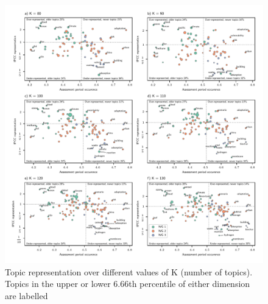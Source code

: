 \documentclass{article}
\begin{document}
	\begin{figure}
		\begin{center}
			\includegraphics[width=1\linewidth]{plots_pub/topic_rep_ks.pdf}
			\caption{Topic representation over different values of K (number of topics). Topics in the upper or lower 6.66th percentile of either dimension are labelled}
			\label{top-rep-ks}
		\end{center}
	\end{figure}
	
	
	
	
	
\end{document}
